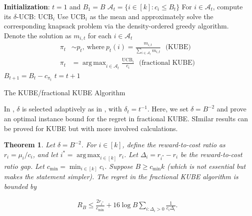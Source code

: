 \documentclass[letterpaper,10pt,openright,openany]{book}
\numberwithin{equation}{section}
\theoremstyle{plain}
\newtheorem{Th}{Theorem}[section]
\theoremstyle{definition}
\DeclareMathOperator*{\argmax}{arg\,max}
\begin{document}
\begin{algorithm}[H]
 \begin{algorithmic}[1]
 \STATE \textbf{Initialization}: $t=1$ and $B_1=B$
 \STATE $\mathcal A_t = \{i\in [k]: c_i\leq B_t\}$
\STATE For $i\in\mathcal A_t$, compute its $\delta$-UCB: $\text{UCB}_i$ 
\STATE Use $\text{UCB}_i$ as the mean and approximately solve the corresponding knapsack problem via the density-ordered greedy algorithm. Denote the solution as $m_{i,t}$ for each $i\in\mathcal A_t$\ \ \ 
\STATE \begin{align*}
\pi_t &\sim p_t,\ \text{where}\ p_t(i)=\frac{m_{i,t}}{\sum_{i\in\mathcal A_t}m_{i,t}}  \ \ \ \text{(KUBE)} \\
\pi_t &= \argmax_{i\in\mathcal A_t}\frac{\text{UCB}_i}{c_i} \ \ \ \text{(fractional KUBE)}
\end{align*}
\STATE $B_{t+1} = B_t-c_{\pi_t}$
\STATE $t = t+1$
\ENDWHILE
\end{algorithmic}
\caption{The KUBE/fractional KUBE Algorithm} 
\label{alg:KUBE}
\end{algorithm}

In \cite{tran2012knapsack}, $\delta$ is selected adaptively as in \cite{auer2002finite}, with $\delta_t = t^{-1}$. Here, we set $\delta = B^{-2}$ and prove an optimal instance bound for the regret in fractional KUBE. SImilar results can be proved for KUBE but with more involved calculations. 

\begin{Th}\label{thm:KUBE}
Let $\delta=B^{-2}$. For $i\in [k]$, define the reward-to-cost ratio as $r_i=\mu_i/c_i$, and let $i^* = \argmax_{i\in [k]}r_i$. Let $\Delta_i = r_{i^*}-r_i$ be the reward-to-cost ratio gap. 
Let $c_{\min} = \min_{i\in [k]}c_i$. %
Suppose $B\geq c_{\min}k$ (which is not essential but makes the statement simpler). The regret in the fractional KUBE algorithm is bounded by
\end{Th}
\begin{align*}
R_B\leq\frac{2r_{i^*}}{c_{\min}}+16\log B\sum_{i: \Delta_i>0}\frac{1}{c_i\Delta_i}.
\end{align*}
\end{document}
